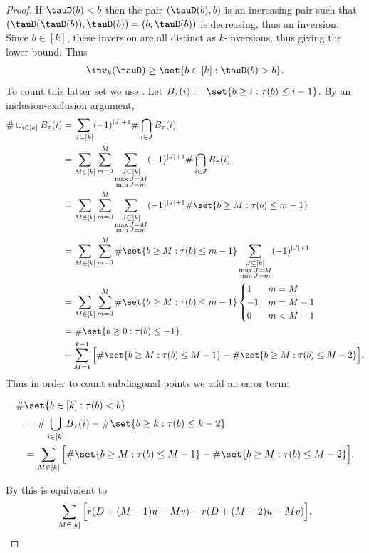 \begin{proof}
    If $\tauD(b)<b$ then the pair $(\tauD(b),b)$ is an increasing pair such that $(\tauD(\tauD(b)),\tauD(b)) = (b,\tauD(b))$ is decreasing, thus an inversion. Since $b \in [k]$, these inversion are all distinct as $k$-inversions, thus giving the lower bound. Thus
    \begin{align*}
        \inv_k(\tauD) \geq \set{b \in [k]:\tauD(b)>b}.
    \end{align*}
    To count this latter set we use . Let $B_\tau(i):= \set{b\geq i :\tau(b)\leq i-1}$. By an inclusion-exclusion argument,
    \begin{align*}
         \#\cup_{i \in [k]} B_\tau(i) &= \sum_{J \subseteq [k]}(-1)^{|J|+1}\#\bigcap_{i \in J} B_\tau(i)\\
         &=\sum_{M \in [k]}\sum_{m = 0}^M\sum_{\substack{J \subseteq [k]\\ \max{J} = M\\
         \min{J} = m}}(-1)^{|J|+1}\#\bigcap_{i \in J} B_\tau(i)\\
         &=\sum_{M \in [k]}\sum_{m = 0}^M\sum_{\substack{J \subseteq [k]\\ \max{J} = M\\
         \min{J} = m}}(-1)^{|J|+1}\# \set{b \geq M:\tau(b) \leq m-1}\\
         &=\sum_{M \in [k]}\sum_{m = 0}^M\# \set{b \geq M:\tau(b) \leq m-1}\sum_{\substack{J \subseteq [k]\\ \max{J} = M\\
         \min{J} = m}}(-1)^{|J|+1}\\
         &=\sum_{M \in [k]}\sum_{m = 0}^M\# \set{b \geq M:\tau(b) \leq m-1}\begin{cases}
             1 & m = M\\
             -1 & m = M-1\\
             0 & m<M-1
         \end{cases}\\
         &= \#\set{b\geq 0:\tau(b)\leq -1} \\&+ \sum_{M = 1}^{k-1} \Big[ \#\set{b \geq M :\tau(b) \leq M-1}-\# \set{b \geq M:\tau(b) \leq M-2} \Big].
    \end{align*}
    Thus in order to count subdiagonal points we add an error term:
    
    \begin{align*}
        \# &\set{b \in [k]:\tau(b)<b} \\
        &= \#\bigcup_{i \in [k]} B_\tau(i) - \#\set{b \geq k:\tau(b) \leq k-2}\\
        &=\sum_{M \in [k]} \Big[ \#\set{b \geq M :\tau(b) \leq M-1}-\# \set{b \geq M:\tau(b) \leq M-2}\Big].
    \end{align*} 
    
    By  this is equivalent to
    \[
        \sum_{M \in [k]} \Big[ r(D+(M-1)u-Mv) - r(D+(M-2)u-Mv) \Big]. \qedhere
        \]
\end{proof}


